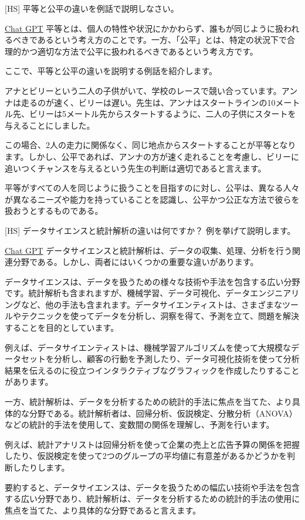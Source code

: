 \documentclass[
]{bxjsbook}
\theoremstyle{definition}
\theoremstyle{definition}
\theoremstyle{definition}
\theoremstyle{definition}
\theoremstyle{remark}
\begin{document}
{[}HS{]} 平等と公平の違いを例話で説明しなさい。

\protect\hyperlink{chatgpt}{Chat GPT} 平等とは、個人の特性や状況にかかわらず、誰もが同じように扱われるべきであるという考え方のことです。一方、「公平」とは、特定の状況下で合理的かつ適切な方法で公平に扱われるべきであるという考え方です。

ここで、平等と公平の違いを説明する例話を紹介します。

アナとビリーという二人の子供がいて、学校のレースで競い合っています。アンナは走るのが速く、ビリーは遅い。先生は、アンナはスタートラインの10メートル先、ビリーは5メートル先からスタートするように、二人の子供にスタートを与えることにしました。

この場合、2人の走力に関係なく、同じ地点からスタートすることが平等となります。しかし、公平であれば、アンナの方が速く走れることを考慮し、ビリーに追いつくチャンスを与えるという先生の判断は適切であると言えます。

平等がすべての人を同じように扱うことを目指すのに対し、公平は、異なる人々が異なるニーズや能力を持っていることを認識し、公平かつ公正な方法で彼らを扱おうとするものである。

{[}HS{]} データサイエンスと統計解析の違いは何ですか？ 例を挙げて説明します。

\protect\hyperlink{chatgpt}{Chat GPT} データサイエンスと統計解析は、データの収集、処理、分析を行う関連分野である。しかし、両者にはいくつかの重要な違いがあります。

データサイエンスは、データを扱うための様々な技術や手法を包含する広い分野です。統計解析も含まれますが、機械学習、データ可視化、データエンジニアリングなど、他の手法も含まれます。データサイエンティストは、さまざまなツールやテクニックを使ってデータを分析し、洞察を得て、予測を立て、問題を解決することを目的としています。

例えば、データサイエンティストは、機械学習アルゴリズムを使って大規模なデータセットを分析し、顧客の行動を予測したり、データ可視化技術を使って分析結果を伝えるのに役立つインタラクティブなグラフィックを作成したりすることがあります。

一方、統計解析は、データを分析するための統計的手法に焦点を当てた、より具体的な分野である。統計解析者は、回帰分析、仮説検定、分散分析（ANOVA）などの統計的手法を使用して、変数間の関係を理解し、予測を行います。

例えば、統計アナリストは回帰分析を使って企業の売上と広告予算の関係を把握したり、仮説検定を使って2つのグループの平均値に有意差があるかどうかを判断したりします。

要約すると、データサイエンスは、データを扱うための幅広い技術や手法を包含する広い分野であり、統計解析は、データを分析するための統計的手法の使用に焦点を当てた、より具体的な分野であると言えます。
\end{document}
